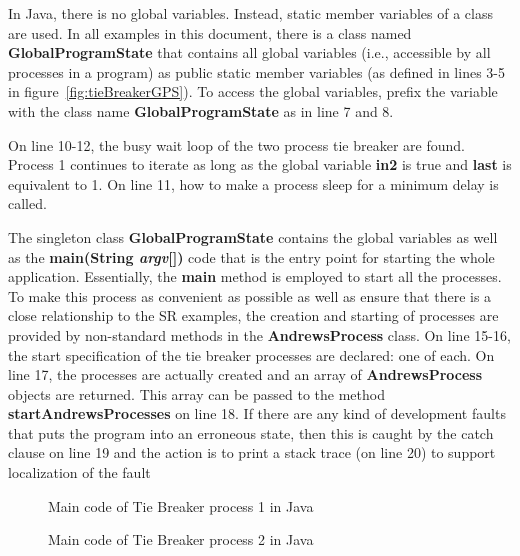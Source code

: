 \documentclass[11pt]{article} %
\begin{document}
In Java, there is no global variables. Instead, static member variables of a class are used. In all examples in this document, there is a class named {\bfseries GlobalProgramState} that contains all global variables (i.e., accessible by all processes in a program) as public static member variables (as defined in lines 3-5 in figure~\ref{fig:tieBreakerGPS}). To access the global variables, prefix the variable with the class name {\bfseries GlobalProgramState} as in line 7 and 8.

On line 10-12, the busy wait loop of the two process tie breaker are found. Process 1 continues to iterate as long as the global variable {\bfseries in2} is true and {\bfseries last} is equivalent to 1. On line 11, how to make a process sleep for a minimum delay is called. 

The singleton class {\bfseries GlobalProgramState} contains the global variables as well as the {\bfseries main(String \emph{argv}[])} code that is the entry point for starting the whole application. Essentially, the {\bfseries main} method is employed to start all the processes. To make this process as convenient as possible as well as ensure that there is a close relationship to the SR examples, the creation and starting of processes are provided by non-standard methods in the {\bfseries AndrewsProcess} class. On line 15-16, the start specification of the tie breaker processes are declared: one of each. On line 17, the processes are actually created and an array of {\bfseries AndrewsProcess} objects are returned. This array can be passed to the method {\bfseries startAndrewsProcesses} on line 18. If there are any kind of development faults that puts the program into an erroneous state, then this is caught by the catch clause on line 19 and the action is to print  a stack trace (on line 20) to support localization of the fault



\lstset{inputpath=c:/git/IT325G/IT325G/examples/se/his/iit/it325g/examples/busyWaiting/twoProcessTieBreaker}
\begin{figure}

\caption{Main code of Tie Breaker process 1 in Java}
\label{fig:tieBreakerProcess1}
\end{figure}

\begin{figure}

\caption{Main code of Tie Breaker process 2 in Java}
\label{fig:tieBreakerProcess2}
\end{figure}
\end{document}
